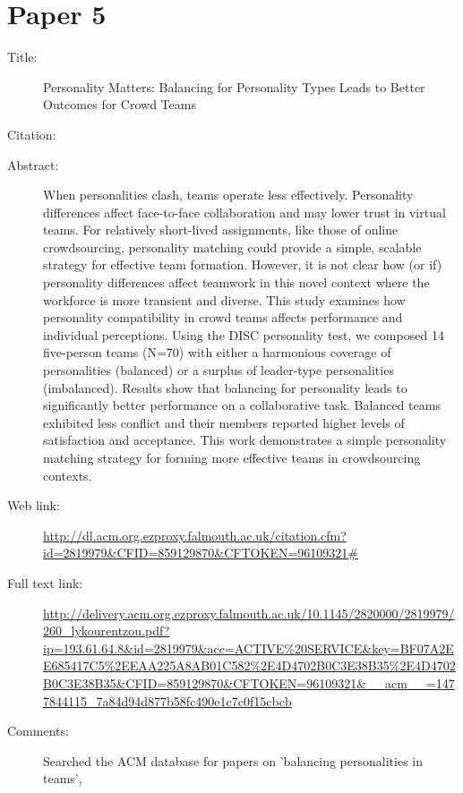 \documentclass{scrartcl}
\begin{document}
\section*{Paper 5}
\begin{description}
\item[Title:] {Personality Matters: Balancing for Personality Types Leads to Better Outcomes for Crowd Teams}
\item[Citation:] \cite{Paper5}
\item[Abstract:]{ When personalities clash, teams operate less effectively. Personality differences affect face-to-face collaboration 
and may lower trust in virtual teams. For relatively short-lived assignments, like those of online crowdsourcing, personality matching 
could provide a simple, scalable strategy for effective team formation. However, it is not clear how (or if) personality differences 
affect teamwork in this novel context where the workforce is more transient and diverse. This study examines how personality 
compatibility in crowd teams affects performance and individual perceptions. Using the DISC personality test, we composed 14 five-person 
teams (N=70) with either a harmonious coverage of personalities (balanced) or a surplus of leader-type personalities (imbalanced). 
Results show that balancing for personality leads to significantly better performance on a collaborative task. Balanced teams exhibited 
less conflict and their members reported higher levels of satisfaction and acceptance. This work demonstrates a simple personality 
matching strategy for forming more effective teams in crowdsourcing contexts.}
\item[Web link:] \url{http://dl.acm.org.ezproxy.falmouth.ac.uk/citation.cfm?id=2819979&CFID=859129870&CFTOKEN=96109321#}
\item[Full text link:] \url{http://delivery.acm.org.ezproxy.falmouth.ac.uk/10.1145/2820000/2819979/260_lykourentzou.pdf?ip=193.61.64.8&id=2819979&acc=ACTIVE%20SERVICE&key=BF07A2EE685417C5%2EEAA225A8AB01C582%2E4D4702B0C3E38B35%2E4D4702B0C3E38B35&CFID=859129870&CFTOKEN=96109321&__acm__=1477844115_7a84d94d877b58fc490e1c7c0f15cbcb}
\item[Comments:] Searched the ACM database for papers on 'balancing personalities in teams', 
\end{description}



\end{document}
